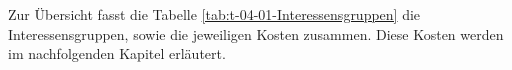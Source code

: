 

Zur Übersicht fasst die Tabelle \ref{tab:t-04-01-Interessensgruppen} die Interessensgruppen, sowie die jeweiligen Kosten zusammen. Diese Kosten werden im nachfolgenden Kapitel erläutert.



%

